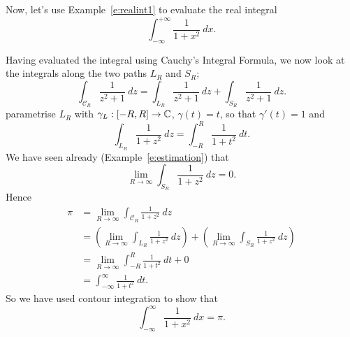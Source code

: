 \begin{example}
Now, let's use Example~\ref{e:realint1} to evaluate the real integral
\[
\int_{-\infty}^{+\infty} \frac{1}{1+x^2}\ dx.
\]
\end{example}
\begin{solution}
Having evaluated the integral using Cauchy's Integral Formula, we now look at the integrals along the two paths $L_R$ and $S_R$;
\[
\int_{\mathcal{C}_R} \frac{1}{z^2+1}\ dz = \int_{L_R} \frac{1}{z^2+1}\ dz + \int_{S_R} \frac{1}{z^2+1}\ dz.
\]
parametrise $L_R$ with $\gamma_L:[-R,R] \to \mathbb{C}$, $\gamma(t)=t$, so that $\gamma'(t)=1$ and
\[
\int_{L_R} \frac{1}{1+z^2}\ dz = \int_{-R}^R \frac{1}{1+t^2}\ dt.
\]
We have seen already (Example~\ref{e:estimation}) that
\[
\lim_{R \to \infty} \int_{S_R} \frac{1}{1+z^2}\ dz = 0.
\]
Hence
\begin{align*}
\pi & = \lim_{R \to \infty} \int_{\mathcal{C}_R} \frac{1}{1+z^2}\ dz \\
& = \left( \lim_{R \to \infty} \int_{L_R} \frac{1}{1+z^2}\ dz \right) +  \left( \lim_{R \to \infty} \int_{S_R} \frac{1}{1+z^2}\ dz \right)  \\
& = \lim_{R \to \infty} \int_{-R}^R \frac{1}{1+t^2}\ dt + 0 \\
& = \int_{-\infty}^{\infty} \frac{1}{1+t^2}\ dt.
\end{align*}
So we have used contour integration to show that
\[
\int_{-\infty}^{\infty} \frac{1}{1+x^2}\ dx = \pi.
\]
\end{solution}


